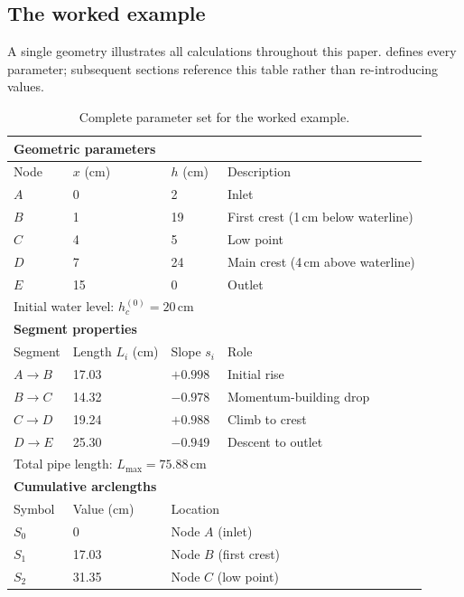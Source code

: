 \documentclass[11pt]{article}
\begin{document}
\subsection{The worked example}
\label{sec:worked-example}

A single geometry illustrates all calculations throughout this paper.  defines every parameter; subsequent sections reference this table rather than re-introducing values.

\begin{table}[H]
\centering
\caption{Complete parameter set for the worked example.}
\label{tab:parameters}
\renewcommand{\arraystretch}{1.2}
\small
\begin{tabular}{llll}
\toprule
\multicolumn{4}{l}{\textbf{Geometric parameters}} \\
\midrule
Node & $x$ (cm) & $h$ (cm) & Description \\
\midrule
$A$ & 0 & 2 & Inlet \\
$B$ & 1 & 19 & First crest (1\,cm below waterline) \\
$C$ & 4 & 5 & Low point \\
$D$ & 7 & 24 & Main crest (4\,cm above waterline) \\
$E$ & 15 & 0 & Outlet \\
\midrule
\multicolumn{4}{l}{Initial water level: $h_c^{(0)} = 20$\,cm} \\
\midrule
\multicolumn{4}{l}{\textbf{Segment properties}} \\
\midrule
Segment & Length $L_i$ (cm) & Slope $s_i$ & Role \\
\midrule
$A \to B$ & 17.03 & $+0.998$ & Initial rise \\
$B \to C$ & 14.32 & $-0.978$ & Momentum-building drop \\
$C \to D$ & 19.24 & $+0.988$ & Climb to crest \\
$D \to E$ & 25.30 & $-0.949$ & Descent to outlet \\
\midrule
\multicolumn{4}{l}{Total pipe length: $L_{\max} = 75.88$\,cm} \\
\midrule
\multicolumn{4}{l}{\textbf{Cumulative arclengths}} \\
\midrule
Symbol & Value (cm) & \multicolumn{2}{l}{Location} \\
\midrule
$S_0$ & 0 & \multicolumn{2}{l}{Node $A$ (inlet)} \\
$S_1$ & 17.03 & \multicolumn{2}{l}{Node $B$ (first crest)} \\
$S_2$ & 31.35 & \multicolumn{2}{l}{Node $C$ (low point)} \\

\end{tabular}
\end{table}
\end{document}
